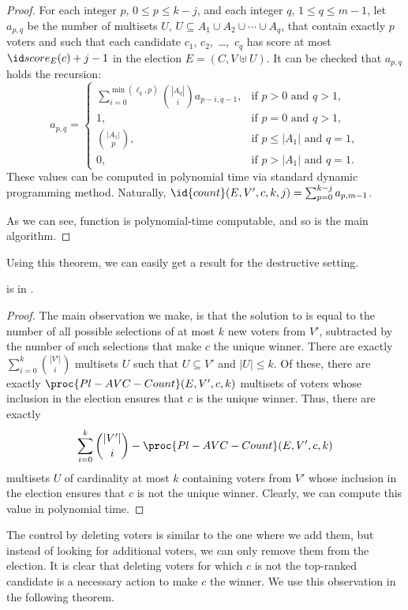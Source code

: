 \begin{proof}
For each integer $p$, $0\le p\le k-j$, and each integer $q$, $1\le q\le m-1$, let $a_{p,q}$ be the number of multisets $U$, $U\subseteq A_1\cup A_2\cup\cdots\cup A_q$, that contain exactly $p$ voters and such that each candidate $c_1$, $c_2$,~\dots,~$c_q$ has score at most $\score{E}(c)+j-1$ in the election $E=(C,V\uplus U)$.
It can be checked that $a_{p,q}$ holds the recursion:
\[
	a_{p,q} =
	\begin{cases}
		\sum_{i=0}^{\min(\ell_q,p)}\!\binom{|A_q|}{i}a_{p-i,q-1}, & \text{if $p>0$ and $q>1$}, \\[2mm]
		1, & \text{if $p=0$ and $q>1$}, \\[1mm]
		\binom{|A_1|}{p}, & \text{if $p\le|A_1|$ and $q=1$}, \\[1mm]
		0, & \text{if $p>|A_1|$ and $q=1$}.
	\end{cases}
\]
These values can be computed in polynomial time via standard dynamic programming method.
Naturally, $\id{count}(E,V',c,k,j)=\sum_{p=0}^{k-j}a_{p,m-1}$.

As we can see, function  is polynomial-time computable, and so is the main algorithm.
\end{proof}

Using this theorem, we can easily get a result for the destructive setting.

\begin{theorem} \label{th:plavd}
	 is in \FPclass.
\end{theorem}

\begin{proof}
The main observation we make, is that the solution to  is equal to the number of all possible selections of at most $k$ new voters from $V'$, subtracted by the number of such selections that make $c$ the unique winner.
There are exactly $\sum_{i=0}^k\binom{|V'|}{i}$ multisets $U$ such that $U\subseteq V'$ and $|U|\le k$.
Of these, there are exactly $\proc{Pl-AVC-Count}(E,V',c,k)$ multisets of voters whose inclusion in the election ensures that $c$ is the unique winner.
Thus, there are exactly
\[
	\sum_{i=0}^k\binom{|V'|}{i}-\proc{Pl-AVC-Count}(E,V',c,k)
\]
multisets $U$ of cardinality at most $k$ containing voters from $V'$ whose inclusion in the election ensures that $c$ is not the unique winner.
Clearly, we can compute this value in polynomial time.
\end{proof}

The control by deleting voters is similar to the one where we add them, but instead of looking for additional voters, we can only remove them from the election.
It is clear that deleting voters for which $c$ is not the top-ranked candidate is a necessary action to make $c$ the winner.
We use this observation in the following theorem.

